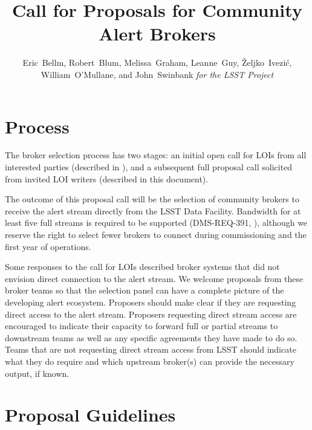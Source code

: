 \documentclass[DM,toc,lsstdraft]{lsstdoc}
\title{Call for Proposals for Community Alert Brokers}
\author{
Eric~Bellm,
Robert~Blum,
Melissa~Graham,
Leanne~Guy,
\v{Z}eljko~Ivezi\'{c},
William~O'Mullane,
and John~Swinbank
\emph{for the LSST Project}
}
\begin{document}

\maketitle

\section{Process}

The broker selection process has two stages:
an initial open call for LOIs from all interested parties (described in ), and a subsequent full proposal call solicited from invited LOI writers (described in this document).

The outcome of this proposal call will be the selection of community brokers to receive the alert stream directly from the LSST Data Facility.
Bandwidth for at least five full streams is required to be supported (DMS-REQ-391, ), although we reserve the right to select fewer brokers to connect during commissioning and the first year of operations.

Some responses to the call for LOIs described broker systems that did not envision direct connection to the alert stream.
We welcome proposals from these broker teams so that the selection panel can have a complete picture of the developing alert ecosystem.
Proposers should make clear if they are requesting direct access to the alert stream.
Proposers requesting direct stream access are encouraged to indicate their capacity to forward full or partial streams to downstream teams as well as any specific agreements they have made to do so. 
Teams that are not requesting direct stream access from LSST should indicate what they do require and which upstream broker(s) can provide the necessary output, if known.


\section{Proposal Guidelines}
\end{document}
